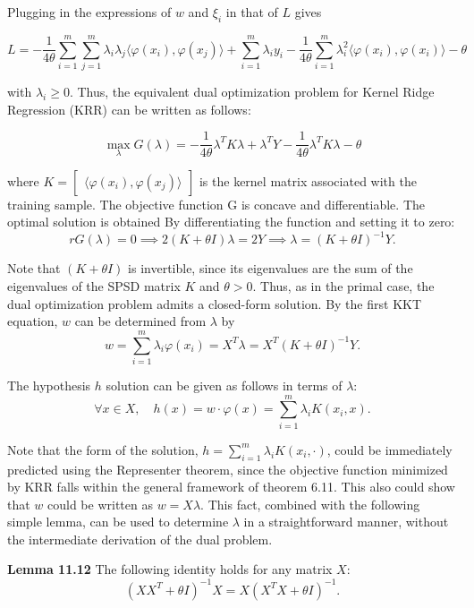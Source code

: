 \documentclass[fleqn,10pt]{olplainarticle}
\begin{document}
Plugging in the expressions of \(w\) and \(\xi_i\) in that of \(L\) gives

\[
L = -\frac{1}{4\theta} \sum_{i=1}^{m} \sum_{j=1}^{m} \lambda_i \lambda_j \langle \varphi(x_i), \varphi(x_j) \rangle + \sum_{i=1}^{m} \lambda_i y_i - \frac{1}{4\theta} \sum_{i=1}^{m} \lambda_i^2 \langle \varphi(x_i), \varphi(x_i) \rangle - \theta
\]

with \(\lambda_i \geq 0\). Thus, the equivalent dual optimization problem for Kernel Ridge Regression (KRR) can be written as follows:

\[
\max_{\lambda} G(\lambda) = -\frac{1}{4\theta} \lambda^T K \lambda + \lambda^T Y - \frac{1}{4\theta} \lambda^T K \lambda - \theta
\]

where \(K = \begin{bmatrix} \langle \varphi(x_i), \varphi(x_j) \rangle \end{bmatrix}\) is the kernel matrix associated with the training sample. The objective function G is concave and differentiable. The optimal solution is obtained
By differentiating the function and setting it to zero:
\[
rG(\lambda) = 0 \implies 2(K + \theta I)\lambda = 2Y \implies \lambda = (K + \theta I)^{-1}Y. \tag{11.17}
\]

Note that \((K+\theta I)\) is invertible, since its eigenvalues are the sum of the eigenvalues of the SPSD matrix \(K\) and \(\theta > 0\). Thus, as in the primal case, the dual optimization problem admits a closed-form solution. By the first KKT equation, \(w\) can be determined from \(\lambda\) by
\[
w = \sum_{i=1}^{m} \lambda_i \varphi(x_i) = X^T \lambda = X^T (K + \theta I)^{-1}Y. \tag{11.18}
\]

The hypothesis \(h\) solution can be given as follows in terms of \(\lambda\):
\[
\forall x \in X, \quad h(x) = w \cdot \varphi(x) = \sum_{i=1}^{m} \lambda_i K(x_i, x). \tag{11.19}
\]

Note that the form of the solution, \(h = \sum_{i=1}^{m} \lambda_i K(x_i, \cdot)\), could be immediately predicted using the Representer theorem, since the objective function minimized by KRR falls within the general framework of theorem 6.11. This also could show that \(w\) could be written as \(w = X\lambda\). This fact, combined with the following simple lemma, can be used to determine \(\lambda\) in a straightforward manner, without the intermediate derivation of the dual problem.

\textbf{Lemma 11.12} The following identity holds for any matrix \(X\):
\[
(XX^T + \theta I)^{-1}X = X(X^TX + \theta I)^{-1}. \tag{11.20}
\]
\end{document}
